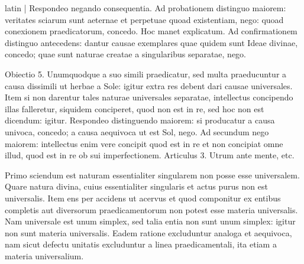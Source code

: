 \begin{otherlanguage*}{latin}
\pstart
\textnormal{|} Respondeo negando consequentia. Ad probationem distinguo maiorem:
veritates sciarum sunt aeternae et perpetuae quoad existentiam, nego:
quoad conexionem praedicatorum, concedo. Hoc manet explicatum. Ad confirmationem distinguo antecedens:
dantur causae exemplares quae quidem sunt Ideae divinae, concedo; quae sunt naturae creatae a singularibus separatae, nego. 
\pend

\pstart
Obiectio 5. Unumquodque a suo simili praedicatur, sed multa praeducuntur a causa dissimili ut herbae a Sole:
igitur extra res debent dari causae universales. Item si non darentur tales naturae universales separatae, intellectus concipendo illas falleretur, siquidem conciperet, quod non est in re, sed hoc non est dicendum:
igitur. Respondeo distinguendo maiorem:
si producatur a causa univoca, concedo; a causa aequivoca ut est Sol, nego. Ad secundum nego maiorem:
intellectus enim vere concipit quod est in re et non concipiat omne illud, quod est in re ob sui imperfectionem. Articulus 3. Utrum ante mente, etc. 
\pend

\pstart
{}
\pend

\pstart
Primo sciendum est naturam essentialiter singularem non posse esse universalem. Quare natura divina, cuius essentialiter singularis et actus purus non est universalis. Item ens per accidens ut acervus et quod componitur ex entibus completis aut diversorum praedicamentorum non potest esse materia universalis. Nam universale est unum simplex, sed talia entia non sunt unum simplex:
igitur non sunt materia universalis. Eadem ratione excluduntur analoga et aequivoca, nam sicut defectu unitatis excluduntur a linea praedicamentali, ita etiam a materia universalium. 
\pend


\end{otherlanguage*}
